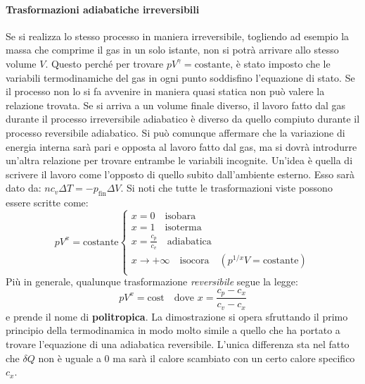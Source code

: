 \documentclass[10pt,a4paper]{book}
\begin{document}
\paragraph{Trasformazioni adiabatiche irreversibili} Se si realizza lo stesso processo in maniera irreversibile, togliendo ad esempio la massa che comprime il gas in un solo istante, non si potrà arrivare allo stesso volume $V$. Questo perché per trovare $pV^{\gamma}=\text{costante}$, è stato imposto che le variabili termodinamiche del gas in ogni punto soddisfino l'equazione di stato. Se il processo non lo si fa avvenire in maniera quasi statica non può valere la relazione trovata. Se si arriva a un volume finale diverso, il lavoro fatto dal gas durante il processo irreversibile adiabatico è diverso da quello compiuto durante il processo reversibile adiabatico.
Si può comunque affermare che la variazione di energia interna sarà pari e opposta al lavoro fatto dal gas, ma si dovrà introdurre un'altra relazione per trovare entrambe le variabili incognite. Un'idea è quella di scrivere il lavoro come l'opposto di quello subito dall'ambiente esterno. Esso sarà dato da: $nc_v\Delta T = - p_{\text{fin}}\Delta V$.
Si noti che tutte le trasformazioni viste possono essere scritte come:
\[
	pV^x=\text{costante} \left\{ \begin{array}{l}
	 	x = 0 \quad \text{isobara}  \\
	 	x = 1 \quad \text{isoterma}  \\
	 	x = \frac{c_p }{c_v } \quad \text{adiabatica}  \\
	 	x \to +\infty  \quad \text{isocora} \quad (p^{1/x}V=\text{costante}) \\
	\end{array} \right.
\]
Più in generale,  qualunque trasformazione \emph{reversibile} segue la legge:
\[
	\boxed{ pV^x=\text{cost}} \quad \text{dove }x=\frac{c_p-c_x  }{c_v-c_x  }
\]
e prende il nome di \textbf{politropica}. La dimostrazione si opera sfruttando il primo principio della termodinamica in modo molto simile a quello che ha portato a trovare l'equazione di una adiabatica reversibile. L'unica differenza sta nel fatto che $\delta Q$ non è uguale a $0$ ma sarà il calore scambiato con un certo calore specifico $c_x$.
\end{document}
